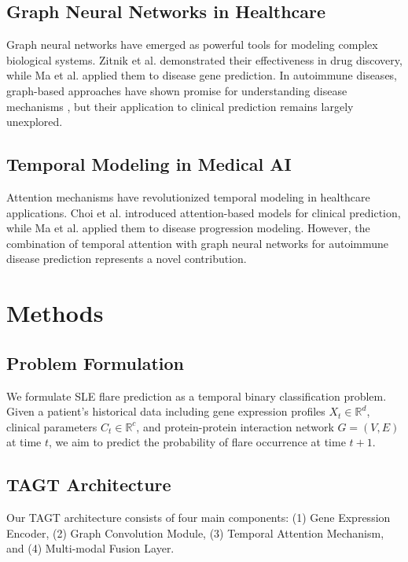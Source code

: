 \documentclass[conference]{IEEEtran}
\begin{document}
\subsection{Graph Neural Networks in Healthcare}

Graph neural networks have emerged as powerful tools for modeling complex biological systems. Zitnik et al. \cite{zitnik2018machine} demonstrated their effectiveness in drug discovery, while Ma et al. \cite{ma2018using} applied them to disease gene prediction. In autoimmune diseases, graph-based approaches have shown promise for understanding disease mechanisms \cite{li2019graph}, but their application to clinical prediction remains largely unexplored.

\subsection{Temporal Modeling in Medical AI}

Attention mechanisms have revolutionized temporal modeling in healthcare applications. Choi et al. \cite{choi2016retain} introduced attention-based models for clinical prediction, while Ma et al. \cite{ma2017dipole} applied them to disease progression modeling. However, the combination of temporal attention with graph neural networks for autoimmune disease prediction represents a novel contribution.

\section{Methods}

\subsection{Problem Formulation}

We formulate SLE flare prediction as a temporal binary classification problem. Given a patient's historical data including gene expression profiles $X_t \in \mathbb{R}^{d}$, clinical parameters $C_t \in \mathbb{R}^{c}$, and protein-protein interaction network $G = (V, E)$ at time $t$, we aim to predict the probability of flare occurrence at time $t+1$.

\subsection{TAGT Architecture}

Our TAGT architecture consists of four main components: (1) Gene Expression Encoder, (2) Graph Convolution Module, (3) Temporal Attention Mechanism, and (4) Multi-modal Fusion Layer.
\end{document}
